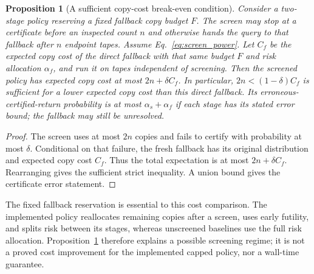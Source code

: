 \documentclass[preprint,11pt,sort&compress]{elsarticle}
\newtheorem{proposition}[theorem]{Proposition}
\begin{document}
\begin{proposition}[A sufficient copy-cost break-even condition]
\label{prop:screen_break_even}
Consider a two-stage policy reserving a fixed fallback copy budget $F$.
The screen may stop at a certificate before an inspected count $n$ and
otherwise hands the query to that fallback after $n$ endpoint tapes.
Assume Eq.~\ref{eq:screen_power}. Let $C_f$ be the expected copy cost of
the direct fallback with that same budget $F$ and risk allocation
$\alpha_f$, and run it on tapes independent of screening. Then the
screened policy has expected copy cost at most $2n+\delta C_f$. In
particular, $2n<(1-\delta)C_f$ is sufficient for a lower expected copy
cost than this direct fallback. Its erroneous-certified-return probability
is at most $\alpha_s+\alpha_f$ if each stage has its stated error bound;
the fallback may still be unresolved.
\end{proposition}
\begin{proof}
The screen uses at most $2n$ copies and fails to certify with probability
at most $\delta$. Conditional on that failure, the fresh fallback has its
original distribution and expected copy cost $C_f$. Thus the total
expectation is at most $2n+\delta C_f$. Rearranging gives the sufficient
strict inequality. A union bound gives the certificate error statement.
\end{proof}
The fixed fallback reservation is essential to this cost comparison. The
implemented policy reallocates remaining copies after a screen, uses early
futility, and splits risk between its stages, whereas unscreened baselines
use the full risk allocation. Proposition~\ref{prop:screen_break_even}
therefore explains a possible screening regime; it is not a proved cost
improvement for the implemented capped policy, nor a wall-time guarantee.
\end{document}

